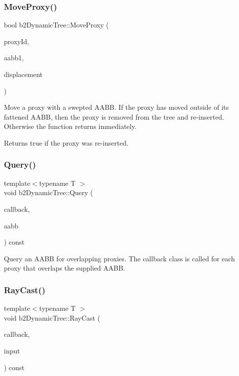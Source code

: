 \subsubsection{\texorpdfstring{Move\+Proxy()}{MoveProxy()}}
{\footnotesize\ttfamily bool b2\+Dynamic\+Tree\+::\+Move\+Proxy (\begin{DoxyParamCaption}\item[{int32}]{proxy\+Id,  }\item[{const \hyperlink{structb2_a_a_b_b}{b2\+A\+A\+BB} \&}]{aabb1,  }\item[{const \hyperlink{structb2_vec2}{b2\+Vec2} \&}]{displacement }\end{DoxyParamCaption})}

Move a proxy with a swepted A\+A\+BB. If the proxy has moved outside of its fattened A\+A\+BB, then the proxy is removed from the tree and re-\/inserted. Otherwise the function returns immediately. \begin{DoxyReturn}{Returns}
true if the proxy was re-\/inserted. 
\end{DoxyReturn}
\mbox{\label{classb2_dynamic_tree_a324df3eb65dfc22d3dcdca387737b193}} 
\subsubsection{\texorpdfstring{Query()}{Query()}}
{\footnotesize\ttfamily template$<$typename T $>$ \\
void b2\+Dynamic\+Tree\+::\+Query (\begin{DoxyParamCaption}\item[{T $\ast$}]{callback,  }\item[{const \hyperlink{structb2_a_a_b_b}{b2\+A\+A\+BB} \&}]{aabb }\end{DoxyParamCaption}) const\hspace{0.3cm}{\ttfamily [inline]}}

Query an A\+A\+BB for overlapping proxies. The callback class is called for each proxy that overlaps the supplied A\+A\+BB. \mbox{\label{classb2_dynamic_tree_aebd2dc6ee462e0cd0763a5f472243a13}} 
\subsubsection{\texorpdfstring{Ray\+Cast()}{RayCast()}}
{\footnotesize\ttfamily template$<$typename T $>$ \\
void b2\+Dynamic\+Tree\+::\+Ray\+Cast (\begin{DoxyParamCaption}\item[{T $\ast$}]{callback,  }\item[{const \hyperlink{structb2_ray_cast_input}{b2\+Ray\+Cast\+Input} \&}]{input }\end{DoxyParamCaption}) const\hspace{0.3cm}{\ttfamily [inline]}}

